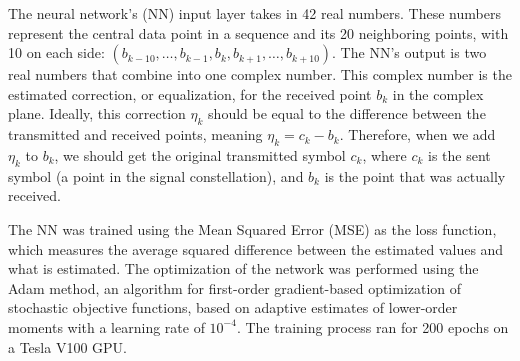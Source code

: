 The neural network's (NN) input layer takes in 42 real numbers. These numbers represent the central data point in a sequence and its 20 neighboring points, with 10 on each side: $(b_{k-10}, \ldots, b_{k-1}, b_{k}, b_{k+1}, \ldots, b_{k+10})$. The NN's output is two real numbers that combine into one complex number. This complex number is the estimated correction, or equalization, for the received point $b_k$ in the complex plane. Ideally, this correction $\eta_k$ should be equal to the difference between the transmitted and received points, meaning $\eta_k = c_k - b_k$. Therefore, when we add $\eta_k$ to $b_k$, we should get the original transmitted symbol $c_k$, where $c_k$ is the sent symbol (a point in the signal constellation), and $b_k$ is the point that was actually received.

The NN was trained using the Mean Squared Error (MSE) as the loss function, which measures the average squared difference between the estimated values and what is estimated. The optimization of the network was performed using the Adam method, an algorithm for first-order gradient-based optimization of stochastic objective functions, based on adaptive estimates of lower-order moments with a learning rate of $10^{-4}$. The training process ran for 200 epochs on a Tesla V100 GPU.



